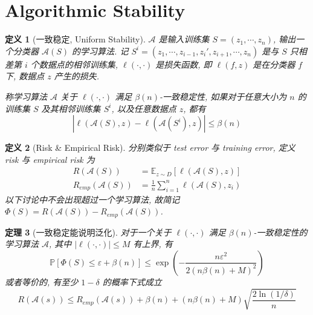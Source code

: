 \documentclass[8pt]{article}
\theoremstyle{compact}
\newtheorem{theorem}{定理}[section]
\newtheorem{definition}[theorem]{定义}
\def\le{\leqslant}
\def\P#1{\mathbb{P}\left[{#1}\right]}
\begin{document}
\section{Algorithmic Stability}
\begin{definition}[一致稳定, Uniform Stability]
	$\mathcal A$ 是输入训练集 $S = (z_1, \cdots, z_n)$, 输出一个分类器 $\mathcal A(S)$ 的学习算法. 记 $S^i = (z_1, \cdots, z_{i-1}, z_i', z_{i+1}, \cdots, z_n)$ 是与 $S$ 只相差第 $i$ 个数据点的相邻训练集, $\ell (\cdot, \cdot)$ 是损失函数, 即 $\ell(f, z)$ 是在分类器 $f$ 下, 数据点 $z$ 产生的损失.

	称学习算法 $\mathcal A$ 关于 $\ell(\cdot, \cdot)$ 满足 $\beta(n)$-一致稳定性, 如果对于任意大小为 $n$ 的训练集 $S$ 及其相邻训练集 $S^i$, 以及任意数据点 $z$, 都有 $$|\ell(\mathcal A(S), z) - \ell(\mathcal A(S^i), z)| \le \beta(n)$$
\end{definition}
\begin{definition}[Risk \& Empirical Risk]
	分别类似于 test error 与 training error, 定义 risk 与 empirical risk 为
	\begin{equation*}
		\begin{split}			
			R(\mathcal A(S)) &= \mathbb E_{z \sim D}[\ell(\mathcal A(S), z)]\\
			R_{emp}(\mathcal A(S)) &= \frac1n \sum_{i=1}^{n}\ell(\mathcal A(S), z_i)
		\end{split}
	\end{equation*}
	以下讨论中不会出现超过一个学习算法, 故简记 $\Phi(S) = R(\mathcal A(S)) - R_{emp}(\mathcal A(S))$.
\end{definition}
\begin{theorem}[一致稳定能说明泛化]
	对于一个关于 $\ell(\cdot, \cdot)$ 满足 $\beta(n)$-一致稳定性的学习算法 $\mathcal A$, 其中 $|\ell(\cdot, \cdot)| \le M$ 有上界, 有 $$\P{\Phi(S) \le \varepsilon + \beta(n)} \le \exp\left( -\frac{n\varepsilon^2}{2(n\beta(n) + M)^2} \right)$$ 或者等价的, 有至少 $1 - \delta$ 的概率下式成立 $$R(\mathcal A(s)) \le R_{emp}(\mathcal A(s)) + \beta(n) + (n\beta(n) + M)\sqrt{\frac{2\ln(1/\delta)}{n}}$$
\end{theorem}
\end{document}
